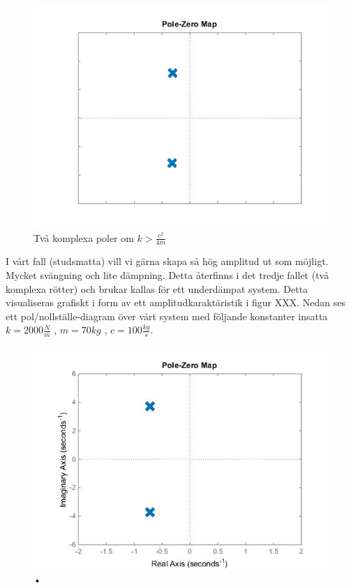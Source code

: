 \documentclass[10pt,a4paper]{article}
\begin{document}
\begin{figure}
\begin{center}
\includegraphics[scale=0.3]{2komplexa}
\caption{Två komplexa poler om $k>\frac{c^2}{4m}$}
\end{center}
\end{figure}
\newpage

I vårt fall (studsmatta) vill vi gärna skapa så hög amplitud ut som möjligt. Mycket svängning och lite dämpning. Detta återfinns i det tredje fallet (två komplexa rötter) och brukar kallas för ett underdämpat system. Detta visualiseras grafiskt i form av ett amplitudkaraktäristik i figur XXX. Nedan ses ett pol/nollställe-diagram över vårt system med följande konstanter insatta $k=2000\frac{N}{m}$ , $m=70kg$ , $c=100\frac{kg}{s}$.


\begin{figure}[h]
\begin{center}
\includegraphics[scale=0.5]{nolpol-diagram}
\caption{•}
\end{center}
\end{figure}
\end{document}
